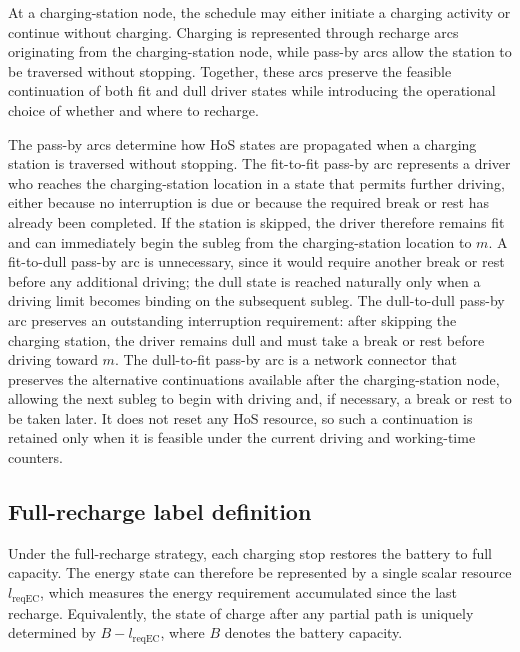 \documentclass[3p,11pt,authoryear]{elsarticle}  %
\begin{document}
At a charging-station node, the schedule may either initiate a charging activity or continue without charging. Charging is represented through recharge arcs originating from the charging-station node, while pass-by arcs allow the station to be traversed without stopping. Together, these arcs preserve the feasible continuation of both fit and dull driver states while introducing the operational choice of whether and where to recharge.

The pass-by arcs determine how HoS states are propagated when a charging station is traversed without stopping. The fit-to-fit pass-by arc represents a driver who reaches the charging-station location in a state that permits further driving, either because no interruption is due or because the required break or rest has already been completed. If the station is skipped, the driver therefore remains fit and can immediately begin the subleg from the charging-station location to \(m\). A fit-to-dull pass-by arc is unnecessary, since it would require another break or rest before any additional driving; the dull state is reached naturally only when a driving limit becomes binding on the subsequent subleg. The dull-to-dull pass-by arc preserves an outstanding interruption requirement: after skipping the charging station, the driver remains dull and must take a break or rest before driving toward \(m\). The dull-to-fit pass-by arc is a network connector that preserves the alternative continuations available after the charging-station node, allowing the next subleg to begin with driving and, if necessary, a break or rest to be taken later. It does not reset any HoS resource, so such a continuation is retained only when it is feasible under the current driving and working-time counters.


\subsection{Full-recharge label definition}


Under the full-recharge strategy, each charging stop restores the battery to full capacity. The energy state can therefore be represented by a single scalar resource \(l_{\text{reqEC}}\), which measures the energy requirement accumulated since the last recharge. Equivalently, the state of charge after any partial path is uniquely determined by \(B-l_{\text{reqEC}}\), where \(B\) denotes the battery capacity.
\end{document}
